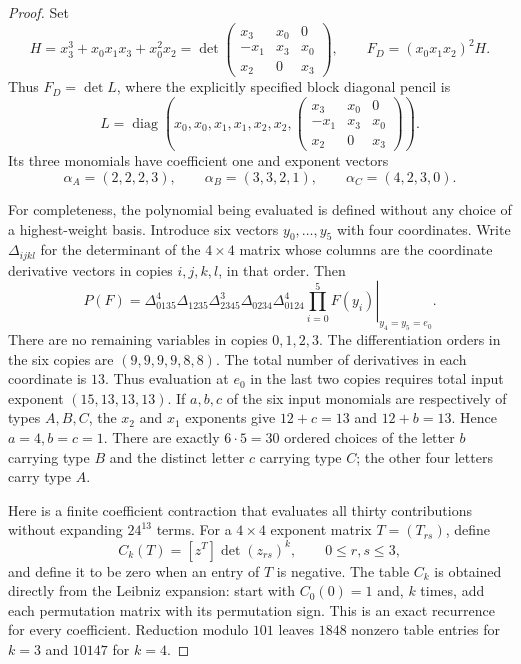 \begin{proof}
Set
\[
 H=x_3^3+x_0x_1x_3+x_0^2x_2
 =\det\begin{pmatrix}
 x_3&x_0&0\\
 -x_1&x_3&x_0\\
 x_2&0&x_3
 \end{pmatrix},
 \qquad
 F_D=(x_0x_1x_2)^2H.
 \tag{QC-006.2}
\]
Thus $F_D=\det L$, where the explicitly specified block diagonal
pencil is
\[
 L=\operatorname{diag}\left(
 x_0,x_0,x_1,x_1,x_2,x_2,
 \begin{pmatrix}x_3&x_0&0\\-x_1&x_3&x_0\\x_2&0&x_3\end{pmatrix}
 \right).
 \tag{QC-006.3}
\]
Its three monomials have coefficient one and exponent vectors
\[
 \alpha_A=(2,2,2,3),\qquad
 \alpha_B=(3,3,2,1),\qquad
 \alpha_C=(4,2,3,0).
 \tag{QC-006.4}
\]

For completeness, the polynomial being evaluated is defined
without any choice of a highest-weight basis. Introduce six
vectors $y_0,\ldots,y_5$ with four coordinates. Write
$\Delta_{ijkl}$ for the determinant of the $4\times4$ matrix
whose columns are the coordinate derivative vectors in copies
$i,j,k,l$, in that order. Then
\[
 P(F)=\left.
 \Delta_{0135}^{4}\Delta_{1235}\Delta_{2345}^{3}
 \Delta_{0234}\Delta_{0124}^{4}
 \prod_{i=0}^{5}F(y_i)\right|_{y_4=y_5=e_0}.
 \tag{QC-006.5}
\]
There are no remaining variables in copies $0,1,2,3$.
The differentiation orders in the six copies are
$(9,9,9,9,8,8)$. The total number of derivatives in each
coordinate is $13$. Thus evaluation at $e_0$ in the last two
copies requires total input exponent $(15,13,13,13)$.
If $a,b,c$ of the six input monomials are respectively of types
$A,B,C$, the $x_2$ and $x_1$ exponents give
$12+c=13$ and $12+b=13$. Hence $a=4,b=c=1$.
There are exactly $6\cdot5=30$ ordered choices of the letter
$b$ carrying type $B$ and the distinct letter $c$ carrying type
$C$; the other four letters carry type $A$.

Here is a finite coefficient contraction that evaluates all
thirty contributions without expanding $24^{13}$ terms.
For a $4\times4$ exponent matrix $T=(T_{rs})$, define
\[
 C_k(T)=[z^T]\det(z_{rs})^k,
 \qquad 0\leq r,s\leq3,
 \tag{QC-006.6}
\]
and define it to be zero when an entry of $T$ is negative.
The table $C_k$ is obtained directly from the Leibniz expansion:
start with $C_0(0)=1$ and, $k$ times, add each permutation
matrix with its permutation sign. This is an exact recurrence
for every coefficient. Reduction modulo $101$ leaves $1848$
nonzero table entries for $k=3$ and $10147$ for $k=4$.


\end{proof}
